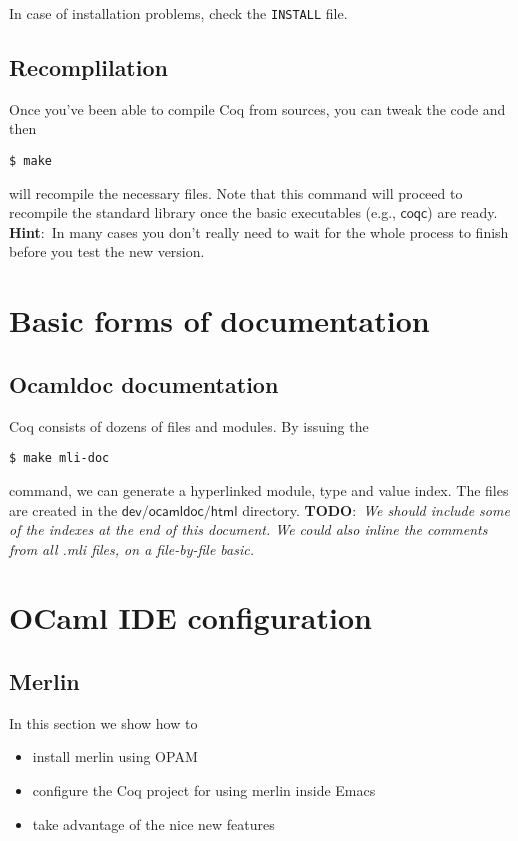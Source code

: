 \documentclass[a4paper,oneside]{book}
\newcommand{\m}[1]{\ensuremath{\mathsf{#1}}}
\newcommand{\hint}{\textbf{Hint}:\ }
\newcommand{\TODO}[1]{\textbf{TODO}:\ \emph{#1}}
\begin{document}
In case of installation problems, check the \verb|INSTALL| file.

\section{Recomplilation}

Once you've been able to compile Coq from sources, you can tweak the
code and then 
\begin{lstlisting}
$ make
\end{lstlisting} will recompile the necessary files. Note
that this command will proceed to recompile the standard library once
the basic executables (e.g., \m{coqc}) are ready. \hint In many cases you
don't really need to wait for the whole process to finish before you 
test the new version.

\chapter{Basic forms of documentation}

\section{Ocamldoc documentation}

Coq consists of dozens of files and modules. By issuing the
\begin{lstlisting}
$ make mli-doc
\end{lstlisting}
command, we can generate a hyperlinked module, type and value
index. The files are created in the \m{dev/ocamldoc/html} directory.
\TODO{We should include some of the indexes at the end of this
  document. We could also inline the comments from all .mli files, on
  a file-by-file basic.}

\chapter{OCaml IDE configuration}

\section{Merlin}

In this section we show how to 
\begin{itemize}
\item install merlin using OPAM
\item configure the Coq project for using merlin inside Emacs
\item take advantage of the nice new features
\end{itemize}
\end{document}
